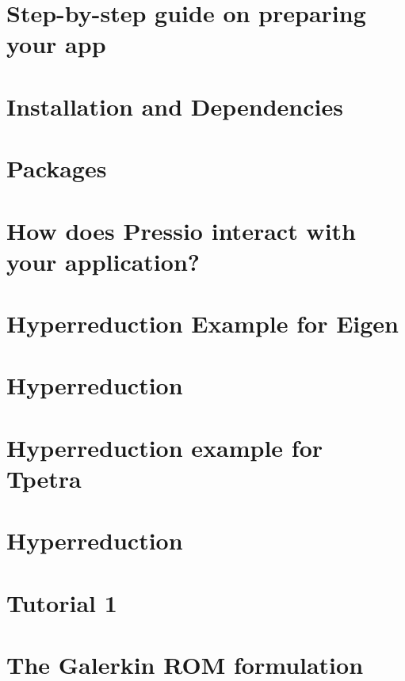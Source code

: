 \documentclass[twoside]{book}
\newcommand{\+}{\discretionary{\mbox{\scriptsize$\hookleftarrow$}}{}{}}
\begin{document}
\chapter{Step-\/by-\/step guide on preparing your app}
\label{autotoc_md13}

\chapter{Installation and Dependencies}
\label{autotoc_md14}

\chapter{Packages}
\label{autotoc_md17}

\chapter{How does Pressio interact with your application?}
\label{autotoc_md18}

\chapter{Hyperreduction Example for Eigen}
\label{autotoc_md19}

\chapter{Hyperreduction}
\label{autotoc_md20}

\chapter{Hyperreduction example for Tpetra}
\label{autotoc_md21}

\chapter{Hyperreduction}
\label{autotoc_md22}

\chapter{Tutorial 1}
\label{autotoc_md27}

\chapter{The Galerkin R\+OM formulation}
\label{autotoc_md28}

\end{document}

